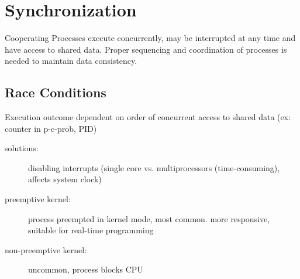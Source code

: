\section*{Synchronization}
Cooperating Processes execute concurrently, may be interrupted at any time and have access to shared data. Proper sequencing and coordination of processes is needed to maintain data consistency.
\subsection*{Race Conditions}
Execution outcome dependent on order of concurrent access to shared data (ex: counter in p-c-prob, PID)
\begin{description}
        \item[solutions:] disabling interrupts (single core vs. multiprocessors (time-consuming), affects system clock)
        \item[preemptive kernel:] process preempted in kernel mode, most common. more responsive, suitable for real-time programming
        \item [non-preemptive kernel:] uncommon, process blocks CPU
\end{description}
